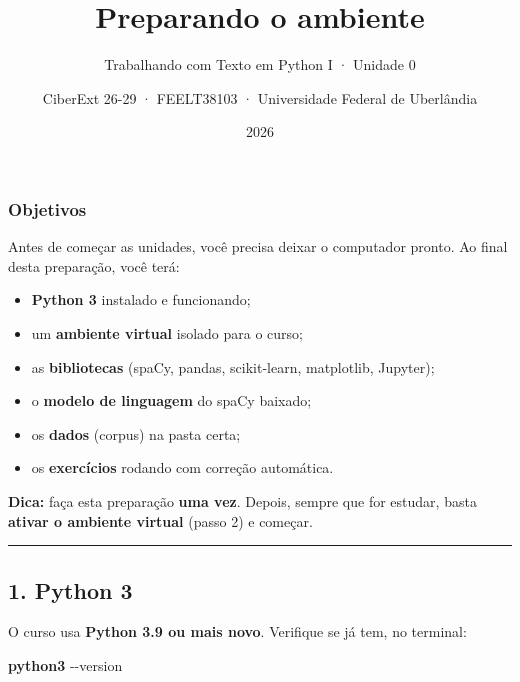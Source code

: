 \documentclass[
  brazilian,
  11pt,
]{article}
\title{Preparando o ambiente}
\subtitle{Trabalhando com Texto em Python I · Unidade 0}
\author{CiberExt 26-29 · FEELT38103 · Universidade Federal de
Uberlândia}
\date{2026}
\newenvironment{Shaded}{\begin{snugshade}}{\end{snugshade}}
\newcommand{\AttributeTok}[1]{\textcolor[rgb]{0.16,0.50,0.73}{#1}}
\newcommand{\ExtensionTok}[1]{\textcolor[rgb]{0.00,0.60,1.00}{\textbf{#1}}}
\providecommand{\tightlist}{%
  \setlength{\itemsep}{0pt}\setlength{\parskip}{0pt}}
\begin{document}
\maketitle

{
\setcounter{tocdepth}{2}
\tableofcontents
}
\subsubsection{Objetivos}\label{objetivos}

Antes de começar as unidades, você precisa deixar o computador pronto.
Ao final desta preparação, você terá:

\begin{itemize}
\tightlist
\item
  \textbf{Python 3} instalado e funcionando;
\item
  um \textbf{ambiente virtual} isolado para o curso;
\item
  as \textbf{bibliotecas} (spaCy, pandas, scikit‑learn, matplotlib,
  Jupyter);
\item
  o \textbf{modelo de linguagem} do spaCy baixado;
\item
  os \textbf{dados} (corpus) na pasta certa;
\item
  os \textbf{exercícios} rodando com correção automática.
\end{itemize}

\begin{tipbox}

\textbf{Dica:} faça esta preparação \textbf{uma vez}. Depois, sempre que
for estudar, basta \textbf{ativar o ambiente virtual} (passo 2) e
começar.

\end{tipbox}

\begin{center}\rule{0.5\linewidth}{0.5pt}\end{center}

\subsection{1. Python 3}\label{python-3}

O curso usa \textbf{Python 3.9 ou mais novo}. Verifique se já tem, no
terminal:

\begin{Shaded}
\begin{Highlighting}[]
\ExtensionTok{python3} \AttributeTok{{-}{-}version}
\end{Highlighting}
\end{Shaded}
\end{document}
